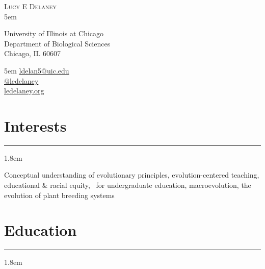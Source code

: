 \documentclass[]{article}
\begin{document}
\BgThispage
\pagestyle{alldocument}

{\fontsize{20}{64}\selectfont \textsc{Lucy E Delaney}}\\

\leftskip 5em
\begin{multicols}{2}

University of Illinois at Chicago\\
Department of Biological Sciences\\
Chicago, IL 60607

\columnbreak

\begin{flushright}
\rightskip 5em
\href{mailto:ldelan5@uic.edu}{ldelan5@uic.edu} \textcolor{light-gray}{\faPaperPlane}\\
\href{https://github.com/ledelaney}{@ledelaney} \textcolor{light-gray}{\faGithub}\\
\href{https://ledelaney.org}{ledelaney.org} \textcolor{light-gray}{\faDesktop}
\end{flushright}

\end{multicols}

\vspace{0.5mm}

\section{Interests}
\hrule
\vspace{3mm}

\leftskip 1.8em

Conceptual understanding of evolutionary principles, evolution-centered teaching, educational \& racial equity, \textcolor{light-gray}{\faRProject}\ for undergraduate education, macroevolution, the evolution of plant breeding systems

\section{Education}
\hrule
\vspace{4mm}
\leftskip 1.8em
\end{document}
